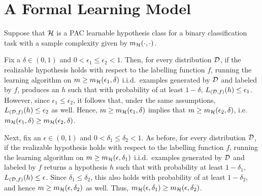 \chapter{A Formal Learning Model}

\begin{ex}
  Suppose that $\mathcal{H}$ is a PAC learnable hypothesis class for a binary
  classification task with a sample complexity given by $m_{\mathcal{H}}(\cdot,\cdot)$.

  Fix a $\delta\in (0,1)$ and
  $0<\epsilon_1\leq\epsilon_2<1$. Then, for every distribution $\mathcal{D}$, if the
  realizable hypothesis holds with respect to the labelling function $f$,
  running the learning algorithm on $m\geq m_{\mathcal{H}}(\epsilon_1, \delta)$ i.i.d.\
  examples generated by $\mathcal{D}$ and labeled by $f$, produces an $h$
  such that with probability of at least $1-\delta$,
  $L_{(\mathcal{D},f)}(h)\leq \epsilon_1$. However, since
  $\epsilon_1\leq \epsilon_2$, it follows that, under the same assumptions,
  $L_{(\mathcal{D},f)}(h)\leq \epsilon_2$ as well. Hence,
  $m\geq m_{\mathcal{H}}(\epsilon_1, \delta)$
  implies that $m\geq m_{\mathcal{H}}(\epsilon_2, \delta)$, i.e.\
  $m_{\mathcal{H}}(\epsilon_1, \delta)\geq m_{\mathcal{H}}(\epsilon_2, \delta)$.

  Next, fix an $\epsilon\in (0,1)$ and $0<\delta_1\leq\delta_2<1$. As before,
  for every distribution $\mathcal{D}$, if the realizable hypothesis holds with respect
  to the labelling function $f$, running the learning algorithm on
  $m\geq m_{\mathcal{H}}(\epsilon,\delta_1)$ i.i.d.\ examples generated by $\mathcal{D}$ and labeled
  by $f$ returns a hypothesis $h$ such that with probability at least
  $1-\delta_1$, $L_{(\mathcal{D},f)}(h)\leq \epsilon$. Since $\delta_1\leq \delta_2$,
  this also holds with probability of at least $1-\delta_2$, and hence
  $m\geq m_{\mathcal{H}}(\epsilon, \delta_2)$ as well. Thus,
  $m_{\mathcal{H}}(\epsilon, \delta_1)\geq m_{\mathcal{H}}(\epsilon, \delta_2)$.
\end{ex}

\begin{ex}
\end{ex}

\begin{ex}
\end{ex}

\begin{ex}
\end{ex}

\begin{ex}
\end{ex}

\begin{ex}
\end{ex}

\begin{ex}
\end{ex}

\begin{ex}
\end{ex}

\begin{ex}
\end{ex}
